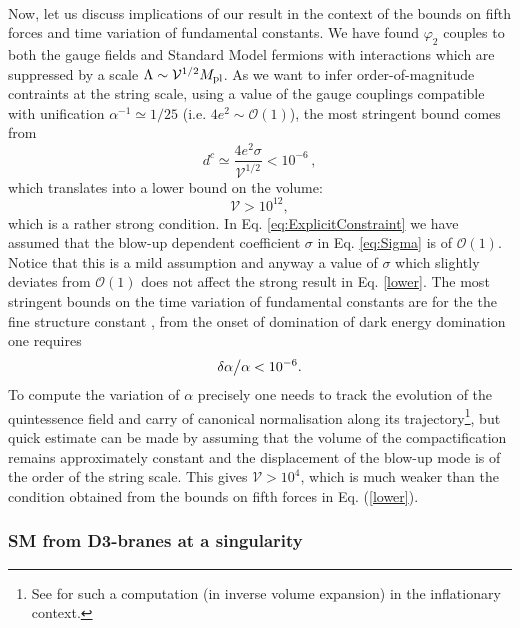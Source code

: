 \documentclass[11pt,a4paper]{article}
\newcommand{\V}{\mathcal{V}}
\def\pref#1{(\ref{#1})}
\begin{document}
\\
Now, let us discuss implications of our result in the context of the bounds on fifth forces and time variation of fundamental constants. We have found $\varphi_2$ couples to both the gauge fields and Standard Model fermions with interactions which are suppressed by a scale $\Lambda \sim \V^{1/2} M_{\rm pl}$. As we want to infer order-of-magnitude contraints at the string scale, using a value of the gauge couplings compatible with unification $\alpha^{-1} \simeq 1/25$ (i.e. $4 e^2 \sim \mathcal{O}(1)$), the most stringent bound comes from
\begin{equation}
\label{eq:ExplicitConstraint}
d^c \simeq \frac{4 e^2 \sigma}{\V^{1/2}} < 10^{-6} \,,
\end{equation}
which translates into a lower bound on the volume:
 \begin{equation}
 \label{lower}
    \V > 10^{12},
    \end{equation}
which is a rather strong condition. In Eq. \eqref{eq:ExplicitConstraint} we have assumed that the blow-up dependent coefficient $\sigma$ in Eq. \eqref{eq:Sigma} is of $\mathcal{O}(1)$. Notice that this is a mild assumption and anyway a value of $\sigma$ which slightly deviates from $\mathcal{O}(1)$ does not affect the strong result in Eq. \eqref{lower}. The most stringent bounds on the time variation of fundamental constants are for the the fine structure constant \cite{Martins:2017yxk}, from the onset of domination of dark energy domination one requires
%
\begin{equation}
\label{alch}
{\delta \alpha \big{/} \alpha} < 10^{-6}.
\end{equation}
To compute the variation of $\alpha$ precisely one needs to track the  evolution of the quintessence field and carry of canonical normalisation along its trajectory\footnote{See \cite{Burgess:2010bz} for such a computation (in inverse volume expansion) in the inflationary context.}, but quick estimate can be made by assuming that the volume of the compactification remains approximately constant and the displacement of the blow-up mode is of the order of the string scale. This gives $\V  > 10^4$, which is much weaker than the condition obtained from the bounds on fifth forces in Eq. \pref{lower}.

\subsubsection{SM from D3-branes at a singularity}
\label{sec:SMSing}
\end{document}
